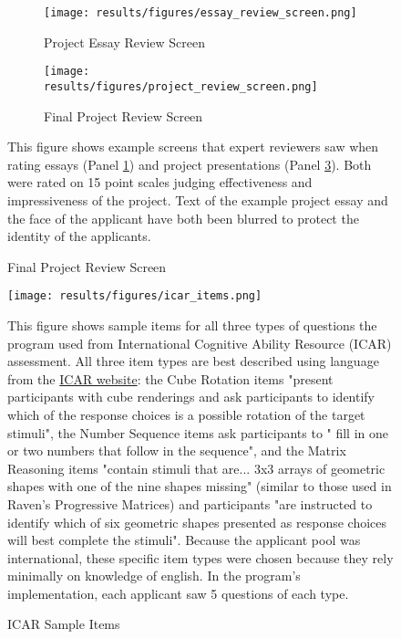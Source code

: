     \newpage
    \begin{figure}[!htb]
        \centering
        \caption{Expert Review Screens}
        \begin{subfigure}[]{\textwidth}
            \centering
                    \caption{Project Essay Review Screen} \label{subfig:essay}
            \texttt{[image: results/figures/essay\_review\_screen.png]} 
        \end{subfigure}
        \hline
        \hfill
        \vspace{1em}
        \begin{subfigure}[]{\textwidth}
            \centering
                    \caption{Final Project Review Screen} \label{subfig:project}
            \texttt{[image: results/figures/project\_review\_screen.png]} 
        \end{subfigure}
        \hline
        \begin{notes}
        This figure shows example screens that expert reviewers saw when rating essays (Panel \ref{subfig:essay}) and project presentations (Panel \ref{subfig:project}). Both were rated on 15 point scales judging effectiveness and impressiveness of the project. Text of the example project essay and the face of the applicant have both been blurred to protect the identity of the applicants. 
        \end{notes}
    \end{figure}
    
    
    \newpage
    \begin{landscape}
    \null
    \vfill
    \begin{figure}[!htb]
    \centering
        \caption{ICAR Sample Items}\label{fig:icar_items}
    \texttt{[image: results/figures/icar\_items.png]} 
        \begin{notes}
    This figure shows sample items for all three types of questions the program used from International Cognitive Ability Resource (ICAR) assessment. All three item types are best described using language from the \hyperlink{https://icar-project.org/types/index.html}{ICAR website}: the Cube Rotation items "present participants with cube renderings and ask participants to identify which of the response choices is a possible rotation of the target stimuli", the Number Sequence items ask participants to " fill in one or two numbers that follow in the sequence", and the Matrix Reasoning items "contain stimuli that are... 3x3 arrays of geometric shapes with one of the nine shapes missing" (similar to those used in Raven's Progressive Matrices) and participants "are instructed to identify which of six geometric shapes presented as response choices will best complete the stimuli". Because the applicant pool was international, these specific item types were chosen because they rely minimally on knowledge of english. In the program's implementation, each applicant saw 5 questions of each type.
        \end{notes}
    \end{figure}
    \vfill
    \end{landscape}
    
